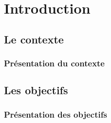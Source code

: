 \section*{Introduction}

\subsection*{Le contexte}
\frame
{
\frametitle{Pr\'esentation du contexte}


}

\subsection*{Les objectifs}
\frame
{
\frametitle{Pr\'esentation des objectifs}


}